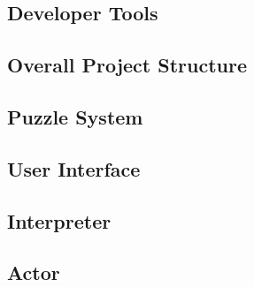 \subsection{Developer Tools}

\newpage

\subsection{Overall Project Structure}

\newpage

\subsection{Puzzle System}

\newpage


\subsection{User Interface}

\newpage


\subsection{Interpreter}
\label{section:interpreter}

\newpage

\subsection{Actor}

\newpage